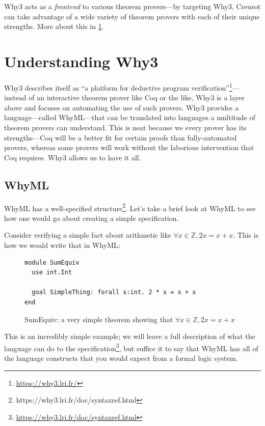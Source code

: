 \documentclass[12pt]{article}
\begin{document}
Why3 acts as a \emph{frontend} to various theorem provers---by targeting Why3, Creusot can take advantage of a wide variety of theorem provers with each of their unique strengths.
More about this in \ref{why-why3}.


\section{Understanding Why3}
\label{why-why3}

Why3 describes itself as ``a platform for deductive program verification''\footnote{\url{https://why3.lri.fr/}}---instead of an interactive theorem prover like Coq or the like, Why3 is a layer above and focuses on automating the use of such provers.\cite{bobotWhy3ShepherdYour}
Why3 provides a language---called WhyML---that can be translated into languages a multitude of theorem provers can understand.
This is neat because we every prover has its strengths---Coq will be a better fit for certain proofs than fully-automated provers, whereas some provers will work without the laborious intervention that Coq requires.
Why3 allows us to have it all.

\subsection{WhyML}

WhyML has a well-specified structure\footnote{https://why3.lri.fr/doc/syntaxref.html}.
Let's take a brief look at WhyML to see how one would go about creating a simple specification.

Consider verifying a simple fact about arithmetic like $\forall x \in \mathbb{Z}, 2x = x + x$.
This is how we would write that in WhyML:

\begin{figure}[h]
\centering
\begin{verbatim}
module SumEquiv
  use int.Int

  goal SimpleThing: forall x:int. 2 * x = x + x
end
\end{verbatim}
\caption{SumEquiv: a very simple theorem showing that $\forall x \in \mathbb{Z}, 2x = x + x$}
\label{fig:sumequiv}
\end{figure}

This is an incredibly simple example; we will leave a full description of what the language can do to the specification\footnote{\url{https://why3.lri.fr/doc/syntaxref.html}}, but suffice it to say that WhyML has all of the language constructs that you would expect from a formal logic system.
\end{document}
